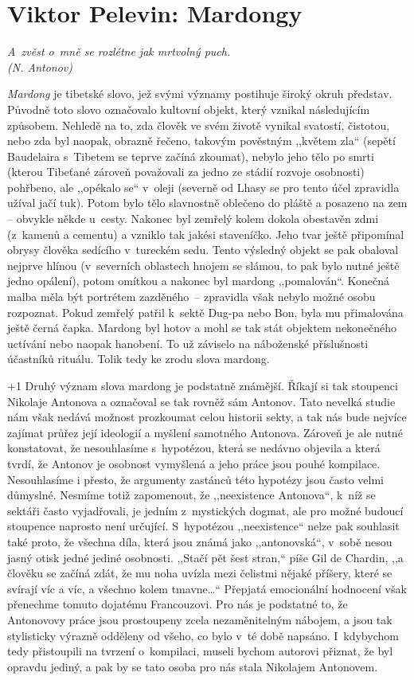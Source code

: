 \section{Viktor Pelevin: Mardongy}

\noindent
\textit{A~zvěst o~mně se rozlétne jak mrtvolný puch. \\ (N. Antonov)}

\medskip
\noindent
\textit{Mardong} je tibetské slovo, jež svými významy postihuje široký okruh představ. Původně toto slovo označovalo kultovní objekt, který vznikal následujícím způsobem. Nehledě na to, zda člověk ve svém životě vynikal svatostí, čistotou, nebo zda byl naopak, obrazně řečeno, takovým pověstným ,,květem zla`` (sepětí Baudelaira s~Tibetem se teprve začíná zkoumat), nebylo jeho tělo po smrti (kterou Tibeťané zároveň považovali za jedno ze stádií rozvoje osobnosti) pohřbeno, ale ,,opékalo se`` v~oleji (severně od Lhasy se pro tento účel zpravidla užíval jačí tuk). Potom bylo tělo slavnostně oblečeno do pláště a posazeno na zem -- obvykle někde u~cesty. Nakonec byl zemřelý kolem dokola obestavěn zdmi (z~kamenů a cementu) a vzniklo tak jakési staveníčko. Jeho tvar ještě připomínal obrysy člověka sedícího v~tureckém sedu. Tento výsledný objekt se pak obaloval nejprve hlínou (v~severních oblastech hnojem se slámou, to pak bylo nutné ještě jedno opálení), potom omítkou a nakonec byl mardong ,,pomalován``. Konečná malba měla být portrétem zazděného~-- zpravidla však nebylo možné osobu rozpoznat. Pokud zemřelý patřil k~sektě Dug-pa nebo Bon, byla mu přimalována ještě černá čapka. Mardong byl hotov a mohl se tak stát objektem nekonečného uctívání nebo naopak hanobení. To už záviselo na náboženské příslušnosti účastníků rituálu. Tolik tedy ke zrodu slova mardong.

\looseness+1 Druhý význam slova mardong je podstatně známější. Říkají si tak stoupenci Nikolaje Antonova a označoval se tak rovněž sám Antonov. Tato nevelká studie nám však nedává možnost prozkoumat celou historii sekty, a tak nás bude nejvíce zajímat průřez její ideologií a myšlení samotného Antonova. Zároveň je ale nutné konstatovat, že nesouhlasíme s~hypotézou, která se nedávno objevila a která tvrdí, že Antonov je osobnost vymyšlená a jeho práce jsou pouhé kompilace. Nesouhlasíme i přesto, že argumenty zastánců této hypotézy jsou často velmi důmyslné. Nesmíme totiž zapomenout, že ,,neexistence Antonova``, k~níž se sektáři často vyjadřovali, je jedním z~mystických dogmat, ale pro možné budoucí stoupence naprosto není určující. S~hypotézou ,,neexistence`` nelze pak souhlasit také proto, že všechna díla, která jsou známá jako ,,antonovská``, v~sobě nesou jasný otisk jedné jediné osobnosti. ,,Stačí pět šest stran,`` píše Gil de Chardin, ,,a člověku se začíná zdát, že mu noha uvízla mezi čelistmi nějaké příšery, které se svírají víc a víc, a všechno kolem tmavne\ldots`` Přepjatá emocionální hodnocení však přenechme tomuto dojatému Francouzovi. Pro nás je podstatné to, že Antonovovy práce jsou prostoupeny zcela nezaměnitelným nábojem, a jsou tak stylisticky výrazně odděleny od všeho, co bylo v~té době napsáno. I~kdybychom tedy přistoupili na tvrzení o~kompilaci, museli bychom autorovi přiznat, že byl opravdu jediný, a pak by se tato osoba pro nás stala Nikolajem Antonovem.


